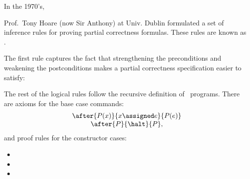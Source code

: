 In the 1970's, 
\begin{editingnotes}\end{editingnotes}
Prof.\ Tony Hoare (now Sir Anthony) at
Univ. Dublin formulated a set of inference rules for proving partial
correctness formulas.  These rules are known as .

The first rule captures the fact that strengthening the preconditions
and weakening the postconditions makes a partial correctness
specification easier to satisfy:


The rest of the logical rules follow the recursive definition of \while\ programs.
There are axioms for the base case commands:
\[\begin{array}{c}
  \after{P(x)}{x \assigned e}{P(e)}\\
  \after{P}{\halt}{P},
\end{array}\]
and proof rules for the constructor cases:

\begin{itemize}

\item
{}

\item
{}
        {}

\item
{}
     {}
\end{itemize}

\begin{example}
\end{example}

\begin{editingnotes}
\end{editingnotes}

\endinput
